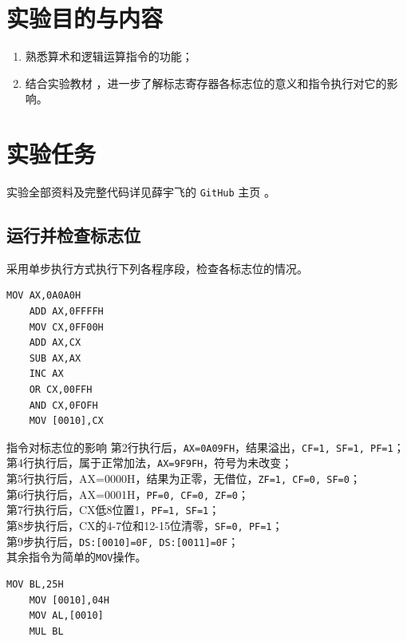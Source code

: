 \documentclass[11pt]{SEU-Digital-Report}
\begin{document}
\exptitlepage

\tableofcontents
\newpage

\section{实验目的与内容}       
\begin{enumerate}
    \item 熟悉算术和逻辑运算指令的功能；
    \item 结合实验教材 \cite{book,guide}，进一步了解标志寄存器各标志位的意义和指令执行对它的影响。   
\end{enumerate}

\section{实验任务}
实验全部资料及完整代码详见薛宇飞的 \texttt{GitHub} 主页 \cite{mygit}。

\subsection{运行并检查标志位}
采用单步执行方式执行下列各程序段，检查各标志位的情况。
\begin{lstlisting}[language={[x86masm]Assembler},title=code1]
    MOV AX,0A0A0H
    ADD AX,0FFFFH
    MOV CX,0FF00H  
    ADD AX,CX
    SUB AX,AX
    INC AX
    OR CX,00FFH
    AND CX,0FOFH
    MOV [0010],CX
\end{lstlisting}

\begin{analyze}{指令对标志位的影响}{}
    第2行执行后，\texttt{AX=0A09FH}，结果溢出，\texttt{CF=1, SF=1, PF=1}；\\
    第4行执行后，属于正常加法，\texttt{AX=9F9FH}，符号为未改变；\\
    第5行执行后，AX=0000H，结果为正零，无借位，\texttt{ZF=1, CF=0, SF=0}；\\
    第6行执行后，AX=0001H，\texttt{PF=0, CF=0, ZF=0}；\\
    第7行执行后，CX低8位置1，\texttt{PF=1, SF=1}；\\
    第8步执行后，CX的4-7位和12-15位清零，\texttt{SF=0, PF=1}；\\
    第9步执行后，\texttt{DS:[0010]=0F, DS:[0011]=0F}；\\
    其余指令为简单的\texttt{MOV}操作。
\end{analyze}

\begin{lstlisting}[language={[x86masm]Assembler},title=code2]
    MOV BL,25H
    MOV [0010],04H
    MOV AL,[0010]
    MUL BL
\end{lstlisting}
\end{document}
